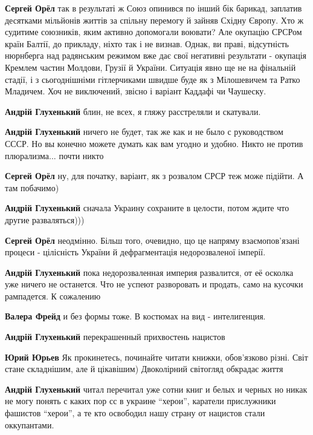 \begin{itemize}
\begin{itemize}

\textbf{Сергей Орёл} так в результаті ж Союз опинився по інший бік барикад,
заплатив десятками мільйонів життів за спільну перемогу й зайняв Східну Європу.
Хто ж судитиме союзників, яким активно допомогали воювати? Але окупацію СРСРом
країн Балтії, до прикладу, ніхто так і не визнав. Однак, ви праві, відсутність
нюрнберга над радянським режимом вже дає свої негативні результати - окупація
Кремлем частин Молдови, Грузії й України. Ситуація явно ще не на фінальній
стадії, і з сьогоднішніми гітлерчиками швидше буде як з Мілошевичем та Ратко
Младичем. Хоч не виключений, звісно і варіант Каддафі чи Чаушеску.


\textbf{Андрій Глухенький} блин, не всех, я гляжу расстреляли и скатували.


\textbf{Андрій Глухенький} ничего не будет, так же как и не было с руководством
СССР. Но вы конечно можете думать как вам угодно и удобно. Никто не против
плюрализма... почти никто

\textbf{Сергей Орёл} ну, для початку, варіант, як з розвалом СРСР теж може підійти. А там побачимо)

\textbf{Андрій Глухенький} сначала Украину сохраните в целости, потом ждите что другие разваляться)))

\textbf{Сергей Орёл} неодмінно. Більш того, очевидно, що це напряму
взаємопов'язані процеси - цілісність України й дефрагментація недорозваленої
імперії.

\textbf{Андрій Глухенький} пока недорозваленная империя развалится, от её осколка уже ничего не останется. Что не успеют разворовать и продать, само на кусочки рампадется. К сожалению

\textbf{Валера Фрейд} и без формы тоже. В костюмах на вид - интелигенция.

\textbf{Андрій Глухенький} перекрашенный прихвостень нацистов


\textbf{Юрий Юрьев} Як прокинетесь, починайте читати книжки, обов'язково різні.
Світ стане складнішим, але й цікавішим) Двоколірний світогляд обкрадає життя


\textbf{Андрій Глухенький} читал перечитал уже сотни книг и белых и черных но
никак не могу понять с каких пор сс в украине \enquote{херои}, каратели прислужники
фашистов \enquote{херои}, а те кто освободил нашу страну от нацистов стали оккупантами.


\end{itemize}
\end{itemize}
